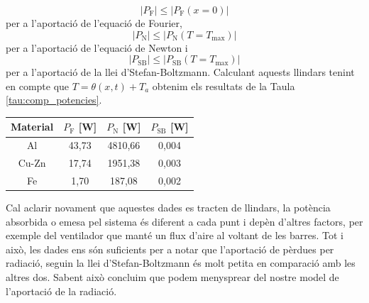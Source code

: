 \documentclass[12pt,twosides,onecolumn,openany]{article}
\newenvironment{Figura}
  {\par\medskip\noindent\minipage{\linewidth}}
  {\endminipage\par\medskip}
\begin{document}
\begin{multicols}{2}
\begin{equation*}
  \left|{P_{\text{F}}}\right| \leq \left| P_{\text{F}}(x=0) \right| 
\end{equation*}
per a l'aportació de l'equació de Fourier,
\begin{equation*}
  \left|P_{\text{N}} \right| \leq \left| P_{\text{N}}(T=T_{\text{max}}) \right|
\end{equation*}
per a l'aportació de l'equació de Newton i
\begin{equation*}
  \left|P_{\text{SB}} \right| \leq \left| P_{\text{SB}}(T=T_{\text{max}}) \right|
\end{equation*}
per a l'aportació de la llei d'Stefan-Boltzmann. Calculant aquests llindars tenint en compte que $T = \theta(x,t) + T_a$ obtenim els resultats de la Taula \ref{tau:comp_potencies}.
\begin{Figura}
  \centering
  \begin{tabular}{c|c|c|c}
    Material & $P_{\text{F}}$ [W] & $P_{\text{N}}$ [W] & $P_{\text{SB}}$ [W]\\ \hline\hline
    Al & 43,73 & 4810,66 & 0,004\\
    Cu-Zn & 17,74 & 1951,38 & 0,003\\
    Fe & 1,70 & 187,08 & 0,002
  \end{tabular}
  \label{tau:comp_potencies}
\end{Figura}
Cal aclarir novament que aquestes dades es tracten de llindars, la potència absorbida o emesa pel sistema és diferent a cada punt i depèn d'altres factors, per exemple del ventilador que manté un flux d'aire al voltant de les barres. Tot i això, les dades ens són suficients per a notar que l'aportació de pèrdues per radiació, seguin la llei d'Stefan-Boltzmann és molt petita en comparació amb les altres dos. Sabent això concluim que podem menysprear del nostre model de l'aportació de la radiació.

\end{multicols}
\end{document}

